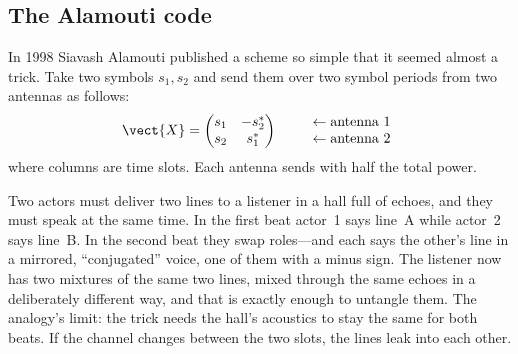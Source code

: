 \subsection{The Alamouti code}

In 1998 Siavash Alamouti published a scheme so simple that it seemed almost a trick. Take two
symbols $s_1,s_2$ and send them over two symbol periods from two antennas as follows:
\begin{equation}
\vect{X}=\begin{pmatrix}s_1 & -s_2^*\\ s_2 & s_1^*\end{pmatrix}
\qquad\begin{array}{l}\leftarrow\text{antenna 1}\\ \leftarrow\text{antenna 2}\end{array}
\label{eq:ch19:alamouti}
\end{equation}
where columns are time slots. Each antenna sends with half the total power.


\begin{analogy}
Two actors must deliver two lines to a listener in a hall full of echoes, and they must speak at
the same time. In the first beat actor~1 says line~A while actor~2 says line~B. In the second beat
they swap roles---and each says the other's line in a mirrored, ``conjugated'' voice, one of them
with a minus sign. The listener now has two mixtures of the same two lines, mixed through the
same echoes in a deliberately different way, and that is exactly enough to untangle them. The
analogy's limit: the trick needs the hall's acoustics to stay the same for both beats. If the
channel changes between the two slots, the lines leak into each other.
\end{analogy}

